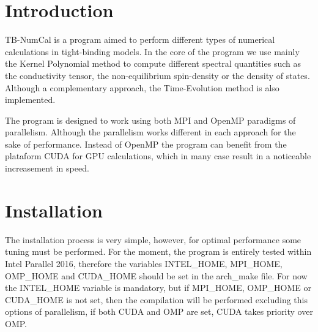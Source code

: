 \hypertarget{index_intro_sec}{}\section{Introduction}\label{index_intro_sec}
T\+B-\/\+Num\+Cal is a program aimed to perform different types of numerical calculations in tight-\/binding models. In the core of the program we use mainly the Kernel Polynomial method to compute different spectral quantities such as the conductivity tensor, the non-\/equilibrium spin-\/density or the density of states. Although a complementary approach, the Time-\/\+Evolution method is also implemented.

The program is designed to work using both M\+P\+I and Open\+M\+P paradigms of parallelism. Although the parallelism works different in each approach for the sake of performance. Instead of Open\+M\+P the program can benefit from the plataform C\+U\+D\+A for G\+P\+U calculations, which in many case result in a noticeable increasement in speed.\hypertarget{index_install_sec}{}\section{Installation}\label{index_install_sec}
The installation process is very simple, however, for optimal performance some tuning must be performed. For the moment, the program is entirely tested within Intel Parallel 2016, therefore the variables I\+N\+T\+E\+L\+\_\+\+H\+O\+M\+E, M\+P\+I\+\_\+\+H\+O\+M\+E, O\+M\+P\+\_\+\+H\+O\+M\+E and C\+U\+D\+A\+\_\+\+H\+O\+M\+E should be set in the arch\+\_\+make file. For now the I\+N\+T\+E\+L\+\_\+\+H\+O\+M\+E variable is mandatory, but if M\+P\+I\+\_\+\+H\+O\+M\+E, O\+M\+P\+\_\+\+H\+O\+M\+E or C\+U\+D\+A\+\_\+\+H\+O\+M\+E is not set, then the compilation will be performed excluding this options of parallelism, if both C\+U\+D\+A and O\+M\+P are set, C\+U\+D\+A takes priority over O\+M\+P. 